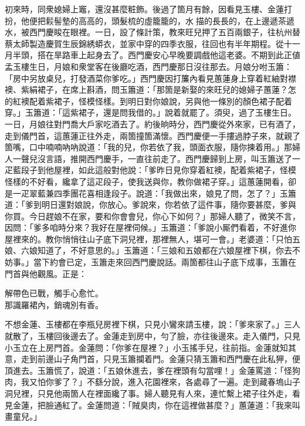 初來時，同衆媳婦上竈，還沒甚麼粧飾。後過了箇月有餘，因看見玉樓、金蓮打扮，他便把鬏髻墊的高高的，頭髮梳的虛籠籠的，水𩬆描的長長的，{}在上邊遞茶遞水，被西門慶睃在眼裡。{}一日，設了條計策，教來旺兒押了五百兩銀子，往杭州替蔡太師製造慶賀生辰錦綉蟒衣，並家中穿的四季衣服，往回也有半年期程。從十一月半頭，搭在旱路車上起身去了。西門慶安心早晚要調戲他這老婆。不期到此正値孟玉樓生日，月娘和衆堂客在後廳吃酒，西門慶那日沒往那去。月娘分咐玉簫：「房中另放桌兒，打發酒菜你爹吃。」西門慶因打簾內看見蕙蓮身上穿着紅紬對襟襖、紫絹裙子，在席上斟酒，問玉簫道：「那箇是新娶的來旺兒的媳婦子蕙蓮？怎的紅襖配着紫裙子，怪模怪樣。{}到明日對你娘說，另與他一條別的顏色裙子配着穿。」玉簫道：「這紫裙子，還是問我借的。」說着就罷了。須臾，過了玉樓生日。一日，月娘往對門喬大戶家吃酒去了。約後晌時分，西門慶從外來家，已有酒了，走到儀門首，這蕙蓮正往外走，兩箇撞箇滿懷。西門慶便一手摟過脖子來，就親了箇嘴，口中喃喃吶吶說道：「我的兒，你若依了我，頭面衣服，隨你揀着用。」{}那婦人一聲兒沒言語，推開西門慶手，一直往前走了。西門慶歸到上房，叫玉簫送了一疋藍段子到他屋裡，如此這般對他說：「爹昨日見你穿着紅襖，配着紫裙子，怪模怪樣的不好看，纔拿了這疋段子，使我送與你，教你做裙子穿。」這蕙蓮開看，卻是一疋翠藍兼四季團花喜相逢段子。說道：「我做出來，娘見了問，怎了？」玉簫道：「爹到明日還對娘說，你放心。爹說來，你若依了這件事，隨你要甚麼，爹與你買。今日趕娘不在家，要和你會會兒，你心下如何？」那婦人聽了，微笑不言，因問：「爹多咱時分來？我好在屋裡伺候。」玉簫道：「爹說小厮們看着，不好進你屋裡來的。教你悄悄往山子底下洞兒裡，那裡無人，堪可一會。」老婆道：「只怕五娘、六娘知道了，不好意思的。」玉簫道：「三娘和五娘都在六娘屋裡下棋，你去不妨事。」當下約會已定，玉簫走來回西門慶說話。兩箇都往山子底下成事，玉簫在門首與他觀風。正是：

\begin{myquote} 
解帶色已戰，{}觸手心愈忙。\\
那識羅裙內，銷魂別有香。
\end{myquote} 

不想金蓮、玉樓都在李瓶兒房裡下棋，只見小鸞來請玉樓，說：「爹來家了。」三人就散了，玉樓回後邊去了。金蓮走到房中，勻了臉，{}亦往後邊來。走入儀門，只見小玉立在上房門首。金蓮問：「你爹在屋裡？」小玉搖手兒，往前指。{}金蓮就知其意，走到前邊山子角門首，只見玉簫攔着門。金蓮只猜玉簫和西門慶在此私狎，便頂進去。玉簫慌了，說道：「五娘休進去，爹在裡頭有勾當哩！」金蓮罵道：「怪狗肉，我又怕你爹了？」不繇分說，進入花園裡來，各處尋了一遍。走到藏春塢山子洞兒裡，只見他兩箇人在裡面纔了事。婦人聽見有人來，連忙繫上裙子往外走，看見金蓮，把臉通紅了。金蓮問道：「賊臭肉，你在這裡做甚麼？」蕙蓮道：「我來叫畫童兒。」

